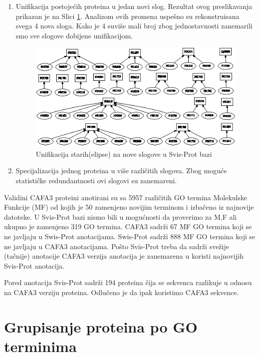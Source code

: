 \begin{enumerate}
  \item Unifikacija postojećih proteina u jedan novi slog. Rezultat ovog
    preslikavanja prikazan je na Slici \ref{fig:unifikacija_slogova}. Analizom
    ovih promena uspešno su rekonstruisana  svega 4 nova sloga. Kako je 4
    suviše mali broj zbog jednostavnosti zanemarili smo sve slogove dobijene
    unifikacijom.

  \begin{figure}[th]
  \centering
  \includegraphics[scale=2]{plots/unifikacija_slogova2.eps}
  \decoRule
  \caption{Unifikacija starih(elipse) na nove slogove u Svis-Prot bazi}
  \label{fig:unifikacija_slogova}
  \end{figure}

  \item Specijalizacija jednog proteina u više različitih slogova.  Zbog moguće
    statističke redundantnosti ovi slogovi su zanemareni.
\end{enumerate}




Validini CAFA3 proteini anotirani su sa  5957 različitih GO termina Molekulske
Funkcije (MF) od kojih je 50 zamenjeno novijim terminom i izbačeno iz najnovije
 datoteke. U Svis-Prot bazi nismo bili u mogućnosti da proverimo
za M,F ali ukupno je zamenjeno 319 GO termina.
CAFA3 sadrži 67 MF GO termina koji se ne javljaju u Swis-Prot anotacijama.
Swis-Prot sadrži 888 MF GO termina koji se ne javljaju u CAFA3 anotacijama.
Pošto Svis-Prot treba da sadrži svežije (tačnije) anotacije CAFA3 verzija
anotacija je zanemarena u koristi najnovijih Svis-Prot anotacija.

Pored anotacija Svis-Prot sadrži 194 proteina čija se sekvenca razlikuje u
odnosu na CAFA3 verziju proteina. Odlučeno je da ipak koristimo CAFA3 sekvence.

\section{Grupisanje proteina po GO terminima}

